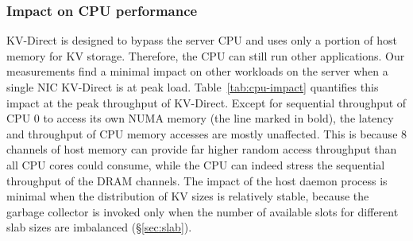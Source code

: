 \subsubsection{Impact on CPU performance}

\begin{table}[t!]
	\centering
    	\caption{Impact on CPU memory access performance when KV-Direct is at peak throughput.}
        \label{tab:cpu-impact}
        \vspace{-5pt}
\end{table}


KV-Direct is designed to bypass the server CPU and uses only a portion of host memory for KV storage. Therefore, the CPU can still run other applications.
Our measurements find a minimal impact on other workloads on the server when a single NIC KV-Direct is at peak load.
Table~\ref{tab:cpu-impact} quantifies this impact at the peak throughput of KV-Direct.
Except for sequential throughput of CPU 0 to access its own NUMA memory (the line marked in bold), the latency and throughput of CPU memory accesses are mostly unaffected.
This is because 8 channels of host memory can provide far higher random access throughput than all CPU cores could consume, while the CPU can indeed stress the sequential throughput of the DRAM channels.
The impact of the host daemon process is minimal when the distribution of KV sizes is relatively stable, because the garbage collector is invoked only when the number of available slots for different slab sizes are imbalanced (\S\ref{sec:slab}).
